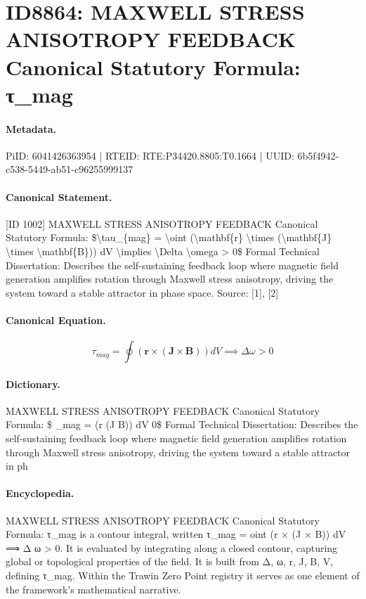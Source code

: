 \section*{ID8864: MAXWELL STRESS ANISOTROPY FEEDBACK Canonical Statutory Formula: τ\_mag}
\paragraph{Metadata.}
PiID: 6041426363954 | RTEID: RTE:P34420.8805:T0.1664 | UUID: 6b5f4942-c538-5449-ab51-c96255999137

\paragraph{Canonical Statement.}
[ID 1002] MAXWELL STRESS ANISOTROPY FEEDBACK Canonical Statutory Formula: \$\textbackslash{}tau\_\{mag\} = \textbackslash{}oint (\textbackslash{}mathbf\{r\} \textbackslash{}times (\textbackslash{}mathbf\{J\} \textbackslash{}times \textbackslash{}mathbf\{B\})) dV \textbackslash{}implies \textbackslash{}Delta \textbackslash{}omega > 0\$ Formal Technical Dissertation: Describes the self-sustaining feedback loop where magnetic field generation amplifies rotation through Maxwell stress anisotropy, driving the system toward a stable attractor in phase space. Source: [1], [2]

\paragraph{Canonical Equation.}
\[
\tau_{mag} = \oint (\mathbf{r} \times (\mathbf{J} \times \mathbf{B})) dV \implies \Delta \omega > 0
\]

\paragraph{Dictionary.}
MAXWELL STRESS ANISOTROPY FEEDBACK Canonical Statutory Formula: \$ \_mag = (r (J B)) dV 0\$ Formal Technical Dissertation: Describes the self-sustaining feedback loop where magnetic field generation amplifies rotation through Maxwell stress anisotropy, driving the system toward a stable attractor in ph

\paragraph{Encyclopedia.}
MAXWELL STRESS ANISOTROPY FEEDBACK Canonical Statutory Formula: τ\_mag is a contour integral, written τ\_mag = oint (r × (J × B)) dV ⟹ Δ ω > 0. It is evaluated by integrating along a closed contour, capturing global or topological properties of the field. It is built from Δ, ω, r, J, B, V, defining τ\_mag. Within the Trawin Zero Point registry it serves as one element of the framework's mathematical narrative.
